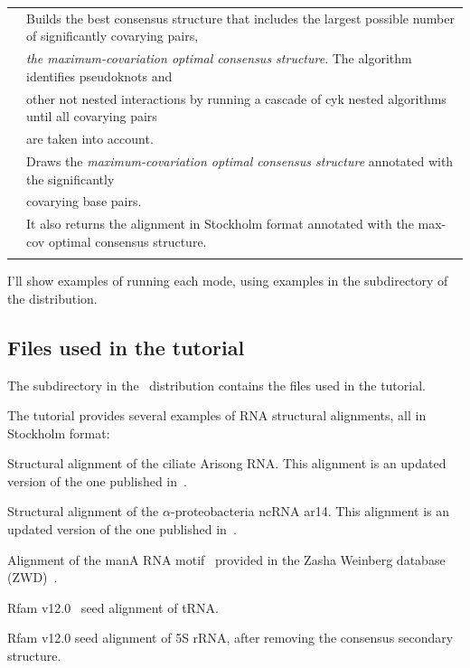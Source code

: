 \begin{tabular}{ll}
\textbf{}   & Builds the best consensus structure that includes the largest possible number of significantly covarying pairs,\\
\textbf{}   & \hspace{5mm}\emph{the maximum-covariation optimal consensus structure}. The algorithm identifies pseudoknots and\\
\textbf{}   & \hspace{5mm}other not nested interactions by running a cascade of cyk nested algorithms until all covarying pairs\\
\textbf{}   & \hspace{5mm}are taken into account.\\
\textbf{}   & Draws the \emph{maximum-covariation optimal consensus structure} annotated with the significantly \\
\textbf{}   & \hspace{5mm}covarying base pairs.\\
\textbf{}   & It also returns the alignment in Stockholm format annotated with the max-cov optimal consensus structure.\\
 & \\ 
\end{tabular}


I'll show examples of running each mode, using examples in the
 subdirectory of the distribution.


\subsection{Files used in the tutorial}

The subdirectory  in the \rscape\ distribution contains the
files used in the tutorial. 

The tutorial provides several examples of RNA structural
alignments, all in Stockholm format:

\begin{sreitems}{}
\item[\emprog{updated\_Arisong.sto}] Structural alignment of the ciliate
  Arisong RNA. This alignment is an updated
  version of the one published in~\citep{JungEddy11}.
\item[\emprog{ar14.sto}] Structural alignment of the $\alpha$-proteobacteria ncRNA ar14. This alignment is an updated version of the one
  published in~\citep{delVal12}.
\item[\emprog{manA.sto}] Alignment of the manA RNA motif~\citep{Weinberg09,Weinberg10} provided in the Zasha Weinberg database (ZWD)~\citep{ZWD18}.
\item[\emprog{RF00005.sto}] Rfam v12.0~\citep{Nawrocki15} seed alignment of tRNA. 
\item[\emprog{RF00001-noss.sto}] Rfam v12.0 seed alignment of 5S rRNA, after removing the consensus secondary structure. 
\end{sreitems}


